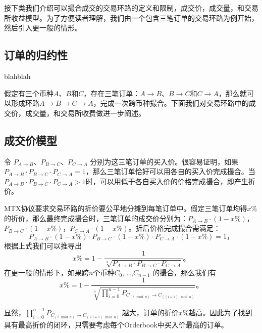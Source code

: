 \documentclass[UTF8,nofonts]{ctexart}
\begin{document}
接下类我们介绍可以撮合成交的交易环路的定义和限制，成交价，成交量，和交易所收益模型。为了方便读者理解，我们由一个包含三笔订单的交易环路为例开始，然后引入更一般的情形。


\subsection{订单的归约性}

blahblah


假定有三个币种$A$、$B$和$C$，存在三笔订单：$A\rightarrow B$、$B \rightarrow C$和$C \rightarrow A$，那么就可以形成环路$A\rightarrow B \rightarrow C \rightarrow A$，完成一次跨币种撮合。下面我们对交易环路中的成交价，成交量，和交易所收费做进一步阐述。

\subsection{成交价模型\label{sec:pricemodel}}

令 $P_{A \rightarrow B}$、$P_{B \rightarrow C}$、$P_{C \rightarrow A}$ 分别为这三笔订单的买入价。很容易证明，如果$P_{A \rightarrow B}\cdot P_{B \rightarrow C}\cdot P_{C \rightarrow A}=1$，那么三笔订单恰好可以用各自的买入价完成撮合。当$P_{A \rightarrow B}\cdot P_{B \rightarrow C}\cdot P_{C \rightarrow A}>1$时，可以用低于各自买入价的价格完成撮合，即产生折价。


MTX协议要求交易环路的折价要公平地分摊到每笔订单中。假定三笔订单均得$x\%$的折价，那么最终完成撮合时，三笔订单的成交价分别为：$P_{A \rightarrow B}\cdot (1-x\%)$，$P_{B \rightarrow C}\cdot (1-x\%)$，$P_{C \rightarrow A}\cdot (1-x\%)$。折后价格完成撮合需满足：
\begin{equation}\label{match}
P_{A \rightarrow B}\cdot (1-x\%)\cdot P_{B \rightarrow C}\cdot (1-x\%)\cdot P_{C \rightarrow A}\cdot (1-x\%) = 1\text{，}
\end{equation}
根据上式我们可以推导出
\begin{equation*}
x\%= 1- \frac{1}{\sqrt[3]{P_{A \rightarrow B}\cdot P_{B \rightarrow C}\cdot P_{C \rightarrow A}}}\text{。}
\end{equation*}
在更一般的情形下，如果跨$n$个币种$C_{0}$, …,$C_{n-1}$ 的撮合，那么我们有
\begin{equation*}
x\%= 1- \frac{1}{\sqrt[n]{\prod_{i=0}^{n-1} P_{C_{(i\mod n)} \rightarrow C_{((i+1)\mod n)}}}}\text{。}
\end{equation*}

显然，$\prod_{i=0}^{n-1} P_{C_{(i\mod n)} \rightarrow C_{((i+1)\mod n)}}$ 越大，订单的折价$x\%$越高。因此为了找到具有最高折价的闭环，只需要考虑每个Orderbook中买入价最高的订单。
\end{document}
